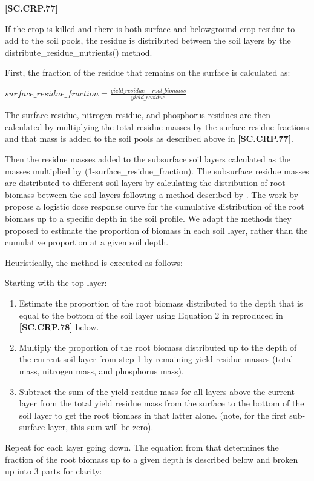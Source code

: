             {\raggedleft \textbf{[SC.CRP.77]}\par}
            \vspace{0.5cm}

If the crop is killed and there is both surface and belowground crop residue to add to the soil pools, the residue is distributed between the soil layers by the distribute\_residue\_nutrients() method. 

First, the fraction of the residue that remains on the surface is calculated as:
   \vspace{0.2cm}

    \begin{center}
        \(surface\_residue\_fraction= \frac{yield\_residue - root\_biomass}{yield\_residue}\)
    \end{center}
        \vspace{0.5cm}

The surface residue, nitrogen residue, and phosphorus residues are then calculated by multiplying the total residue masses by the surface residue fractions and that mass is added to the soil pools as described above in \textbf{[SC.CRP.77]}. 

Then the residue masses added to the subsurface soil layers calculated as the masses multiplied by (1-surface\_residue\_fraction). The subsurface residue masses are distributed to different soil layers by calculating the distribution of root biomass between the soil layers following a method described by \cite{fan2016root}. The work by \cite{fan2016root} propose a logistic dose response curve for the cumulative distribution of the root biomass up to a specific depth in the soil profile. We adapt the methods they proposed to estimate the proportion of biomass in each soil layer, rather than the cumulative proportion at a given soil depth.

Heuristically, the method is executed as follows:

Starting with the top layer:
\begin{enumerate}
    \item Estimate the proportion of the root biomass distributed to the depth that is equal to the bottom of the soil layer using Equation 2 in \cite{fan2016root} reproduced in \textbf{[SC.CRP.78]} below.
    \item Multiply the proportion of the root biomass distributed up to the depth of the current soil layer from step 1 by remaining yield residue masses (total mass, nitrogen mass, and phosphorus mass). 
    \item Subtract the sum of the yield residue mass for all layers above the current layer from the total yield residue mass from the surface to the bottom of the soil layer to get the root biomass in that latter alone. (note, for the first sub-surface layer, this sum will be zero).

\end{enumerate}
Repeat for each layer going down. 
The equation from \cite{fan2016root} that determines the fraction of the root biomass up to a given depth is described below and broken up into 3 parts for clarity:
   \vspace{0.2cm}

